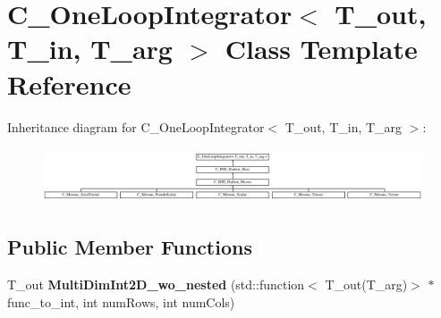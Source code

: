 \hypertarget{class_c___one_loop_integrator}{\section{C\-\_\-\-One\-Loop\-Integrator$<$ T\-\_\-out, T\-\_\-in, T\-\_\-arg $>$ Class Template Reference}
\label{class_c___one_loop_integrator}
}
Inheritance diagram for C\-\_\-\-One\-Loop\-Integrator$<$ T\-\_\-out, T\-\_\-in, T\-\_\-arg $>$\-:\begin{figure}[H]
\begin{center}
\leavevmode
\includegraphics[height=1.647059cm]{class_c___one_loop_integrator}
\end{center}
\end{figure}
\subsection*{Public Member Functions}
\begin{DoxyCompactItemize}
\item 
\hypertarget{class_c___one_loop_integrator_a5e7c8284194da215e0f1a883ec97068f}{T\-\_\-out {\bfseries Multi\-Dim\-Int2\-D\-\_\-wo\-\_\-nested} (std\-::function$<$ T\-\_\-out(T\-\_\-arg)$>$ $\ast$func\-\_\-to\-\_\-int, int num\-Rows, int num\-Cols)}\label{class_c___one_loop_integrator_a5e7c8284194da215e0f1a883ec97068f}

\end{DoxyCompactItemize}
